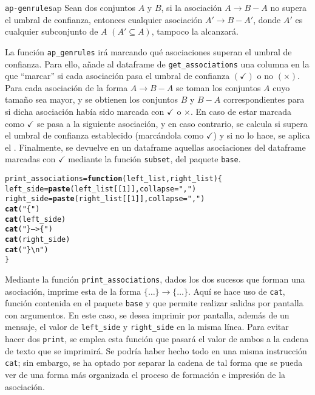\documentclass[12pt]{report}\usepackage[]{graphicx}\usepackage[dvipsnames]{xcolor}
\makeatletter
\newcommand{\hlnum}[1]{\textcolor[rgb]{0.686,0.059,0.569}{#1}}%
\newcommand{\hlstr}[1]{\textcolor[rgb]{0.192,0.494,0.8}{#1}}%
\newcommand{\hlstd}[1]{\textcolor[rgb]{0.345,0.345,0.345}{#1}}%
\newcommand{\hlkwa}[1]{\textcolor[rgb]{0.161,0.373,0.58}{\textbf{#1}}}%
\newcommand{\hlkwb}[1]{\textcolor[rgb]{0.69,0.353,0.396}{#1}}%
\newcommand{\hlkwc}[1]{\textcolor[rgb]{0.333,0.667,0.333}{#1}}%
\newcommand{\hlkwd}[1]{\textcolor[rgb]{0.737,0.353,0.396}{\textbf{#1}}}%
\newenvironment{kframe}{%
 \def\at@end@of@kframe{}%
 \ifinner\ifhmode%
  \def\at@end@of@kframe{\end{minipage}}%
  \begin{minipage}{\columnwidth}%
 \fi\fi%
 \def\FrameCommand##1{\hskip\@totalleftmargin \hskip-\fboxsep
 \colorbox{shadecolor}{##1}\hskip-\fboxsep
     \hskip-\linewidth \hskip-\@totalleftmargin \hskip\columnwidth}%
 \MakeFramed {\advance\hsize-\width
   \@totalleftmargin\z@ \linewidth\hsize
   \@setminipage}}%
 {\par\unskip\endMakeFramed%
 \at@end@of@kframe}
\newenvironment{knitrout}{}{} %
\makeatother
\begin{document}
			\begin{teorema}{\texttt{ap-genrules}}{ap}
				Sean dos conjuntos $A$ y $B$, si la asociación $A \rightarrow B - A$ no supera el umbral de confianza, entonces cualquier asociación $A' \rightarrow B - A'$, donde $A'$ es cualquier subconjunto de $A$ $(A' \subseteq A)$, tampoco la alcanzará. 
			\end{teorema}
			
			La función \texttt{ap\_genrules} irá marcando qué asociaciones superan el umbral de confianza. Para ello, añade al dataframe de \texttt{get\_associations} una columna en la que ``marcar'' si cada asociación pasa el umbral de confianza $(\checkmark)$ o no $(\times)$. Para cada asociación de la forma $A \rightarrow B - A$ se toman los conjuntos $A$ cuyo tamaño sea mayor, y se obtienen los conjuntos $B$ y $B - A$ correspondientes para si dicha asociación había sido marcada con $\checkmark$ o $\times$. En caso de estar marcada como $\checkmark$ se pasa a la siguiente asociación, y en caso contrario, se calcula si supera el umbral de confianza establecido (marcándola como $\checkmark$) y si no lo hace, se aplica el . Finalmente, se devuelve en un dataframe aquellas asociaciones del dataframe marcadas con $\checkmark$ mediante la función \texttt{subset}, del paquete \texttt{base}. \\ 
			
\begin{knitrout}
\color{fgcolor}\begin{kframe}
\begin{alltt}
\hlstd{print_associations} \hlkwb{=} \hlkwa{function}\hlstd{(}\hlkwc{left_list}\hlstd{,} \hlkwc{right_list}\hlstd{) \{}
        \hlstd{left_side} \hlkwb{=} \hlkwd{paste}\hlstd{(left_list[[}\hlnum{1}\hlstd{]],} \hlkwc{collapse} \hlstd{=} \hlstr{","}\hlstd{)}
        \hlstd{right_side} \hlkwb{=} \hlkwd{paste}\hlstd{(right_list[[}\hlnum{1}\hlstd{]],} \hlkwc{collapse} \hlstd{=} \hlstr{","}\hlstd{)}
        \hlkwd{cat}\hlstd{(}\hlstr{"\{"}\hlstd{)}
        \hlkwd{cat}\hlstd{(left_side)}
        \hlkwd{cat}\hlstd{(}\hlstr{"\} --> \{"}\hlstd{)}
        \hlkwd{cat}\hlstd{(right_side)}
        \hlkwd{cat}\hlstd{(}\hlstr{"\}\textbackslash{}n"}\hlstd{)}
\hlstd{\}}
\end{alltt}
\end{kframe}
\end{knitrout}
			
			Mediante la función \texttt{print\_associations}, dados los dos sucesos que forman una asociación, imprime esta de la forma $\{\ldots\} \rightarrow \{\ldots\}$. Aquí se hace uso de \texttt{cat}, función contenida en el paquete \texttt{base} y que permite realizar salidas por pantalla con argumentos. En este caso, se desea imprimir por pantalla, además de un mensaje, el valor de \texttt{left_side} y \texttt{right_side} en la misma línea. Para evitar hacer dos \texttt{print}, se emplea esta función que pasará el valor de ambos a la cadena de texto que se imprimirá. Se podría haber hecho todo en una misma instrucción \texttt{cat}; sin embargo, se ha optado por separar la cadena de tal forma que se pueda ver de una forma más organizada el proceso de formación e impresión de la asociación.
			
\end{document}
